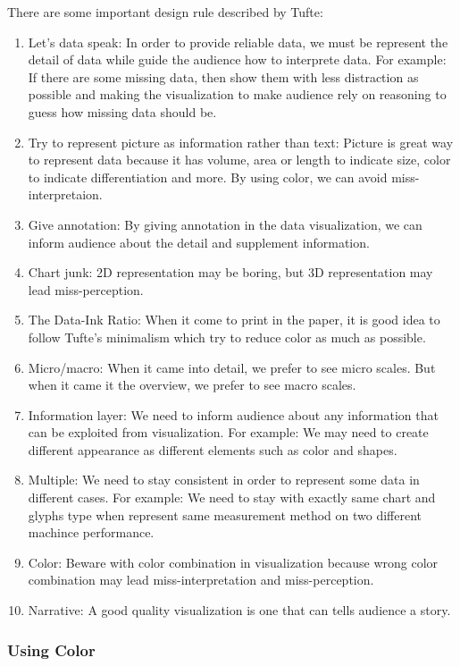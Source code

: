 \documentclass[11pt]{article}
\providecommand{\tightlist}{%
      \setlength{\itemsep}{0pt}\setlength{\parskip}{0pt}}
\begin{document}
There are some important design rule described by Tufte:

\begin{enumerate}
\def\labelenumi{\arabic{enumi}.}
\tightlist
\item
  Let's data speak: In order to provide reliable data, we must be
  represent the detail of data while guide the audience how to
  interprete data. For example: If there are some missing data, then
  show them with less distraction as possible and making the
  visualization to make audience rely on reasoning to guess how missing
  data should be.
\item
  Try to represent picture as information rather than text: Picture is
  great way to represent data because it has volume, area or length to
  indicate size, color to indicate differentiation and more. By using
  color, we can avoid miss-interpretaion.
\item
  Give annotation: By giving annotation in the data visualization, we
  can inform audience about the detail and supplement information.
\item
  Chart junk: 2D representation may be boring, but 3D representation may
  lead miss-perception.
\item
  The Data-Ink Ratio: When it come to print in the paper, it is good
  idea to follow Tufte's minimalism which try to reduce color as much as
  possible.
\item
  Micro/macro: When it came into detail, we prefer to see micro scales.
  But when it came it the overview, we prefer to see macro scales.
\item
  Information layer: We need to inform audience about any information
  that can be exploited from visualization. For example: We may need to
  create different appearance as different elements such as color and
  shapes.
\item
  Multiple: We need to stay consistent in order to represent some data
  in different cases. For example: We need to stay with exactly same
  chart and glyphs type when represent same measurement method on two
  different machince performance.
\item
  Color: Beware with color combination in visualization because wrong
  color combination may lead miss-interpretation and miss-perception.
\item
  Narrative: A good quality visualization is one that can tells audience
  a story.
\end{enumerate}

    \subsubsection{Using Color}\label{using-color}
\end{document}
